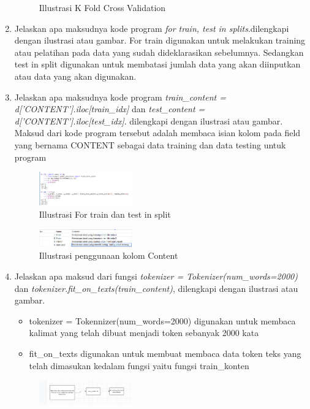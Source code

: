\begin{enumerate}
\begin{figure}[H]
    \centering
    \caption{Illustrasi K Fold Cross Validation}
\end{figure}
\item
Jelaskan apa maksudnya kode program \emph{for train, test in splits}.dilengkapi dengan ilustrasi atau gambar.
For train digunakan untuk melakukan training atau pelatihan pada data yang sudah dideklarasikan sebelumnya. Sedangkan test in split digunakan untuk membatasi jumlah data yang akan diinputkan atau data yang akan digunakan.
\item
Jelaskan apa maksudnya kode program \emph{train\_content = d['CONTENT'].iloc[train\_idx]} dan \emph{test\_content = d['CONTENT'].iloc[test\_idx]}. dilengkapi dengan ilustrasi atau gambar.
Maksud dari kode program tersebut adalah membaca isian kolom pada ﬁeld yang bernama CONTENT sebagai data training dan data testing untuk program 
\begin{figure}[H]
    \includegraphics[width=4cm]{figures/1174003/7/teori_3.png}
    \centering
    \caption{Illustrasi For train dan test in split}
\end{figure}
\begin{figure}[H]
    \includegraphics[width=4cm]{figures/1174003/7/teori_4.png}
    \centering
    \caption{Illustrasi penggunaan kolom Content}
\end{figure}
\item
Jelaskan apa maksud dari fungsi \emph{tokenizer = Tokenizer(num\_words=2000)} dan \emph{tokenizer.fit\_on\_texts(train\_content)}, dilengkapi dengan ilustrasi atau gambar.
\begin{itemize}
    \item tokenizer = Tokennizer(num\_words=2000) digunakan untuk membaca kalimat yang telah dibuat menjadi token sebanyak 2000 kata
    \item fit\_on\_texts digunakan untuk membuat membaca data token teks yang telah dimasukan kedalam fungsi yaitu fungsi train\_konten
\end{itemize}
\begin{figure}[H]
    \includegraphics[width=4cm]{figures/1174003/7/teori_5.png}

\end{figure}
\end{enumerate}
